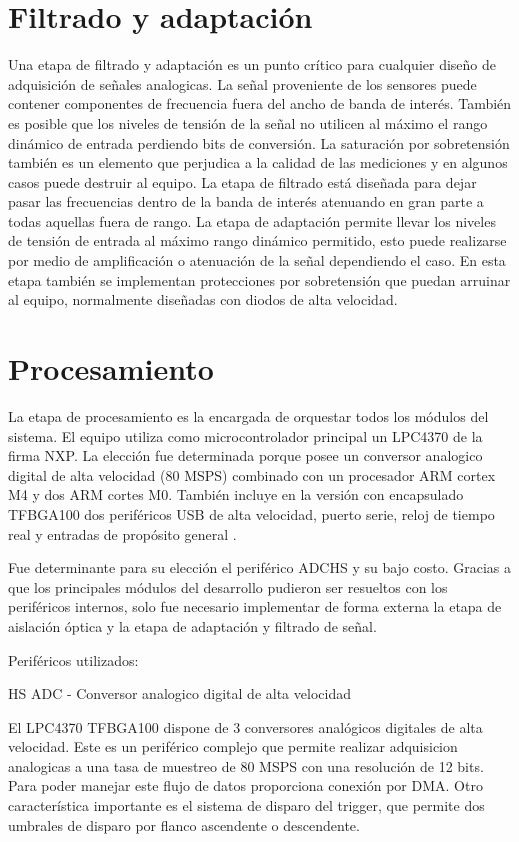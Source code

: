 \section{Filtrado y adaptación}
Una etapa de filtrado y adaptación es un punto crítico para cualquier diseño de adquisición de señales analogicas. La señal proveniente de los sensores puede contener componentes de frecuencia fuera del ancho de banda de interés. También es posible que los niveles de tensión de la señal no utilicen al máximo el rango dinámico de entrada perdiendo bits de conversión. La saturación por sobretensión también es un elemento que perjudica a la calidad de las mediciones y en algunos casos puede destruir al equipo.
La etapa de filtrado está diseñada para dejar pasar las frecuencias dentro de la banda de interés atenuando en gran parte a todas aquellas fuera de rango.
La etapa de adaptación permite llevar los niveles de tensión de entrada al máximo rango dinámico permitido, esto puede realizarse por medio de amplificación o atenuación de la señal dependiendo el caso. En esta etapa también se implementan protecciones por sobretensión que puedan arruinar al equipo, normalmente diseñadas con diodos de alta velocidad.

\section{Procesamiento}
La etapa de procesamiento es la encargada de orquestar todos los módulos del sistema. El equipo utiliza como microcontrolador principal un LPC4370 de la firma NXP. La elección fue determinada porque posee un conversor analogico digital de alta velocidad (80 MSPS) combinado con un procesador ARM cortex M4 y dos ARM cortes M0. También incluye en la versión con encapsulado TFBGA100 dos periféricos USB de alta velocidad, puerto serie, reloj de tiempo real y entradas de propósito general \citep{micro:lpc4370}.

Fue determinante para su elección el periférico ADCHS y su bajo costo. Gracias a que los principales módulos del desarrollo pudieron ser resueltos con los periféricos internos, solo fue necesario implementar de forma externa la etapa de aislación óptica y la etapa de adaptación y filtrado de señal.

Periféricos utilizados: 

HS ADC - Conversor analogico digital de alta velocidad

El LPC4370 TFBGA100 dispone de 3 conversores analógicos digitales de alta velocidad. Este es un periférico complejo que permite realizar adquisicion analogicas a una tasa de muestreo de 80 MSPS con una resolución de 12 bits. Para poder manejar este flujo de datos proporciona conexión por DMA. Otro característica importante es el sistema de disparo del trigger, que permite dos umbrales de disparo por flanco ascendente o descendente.

